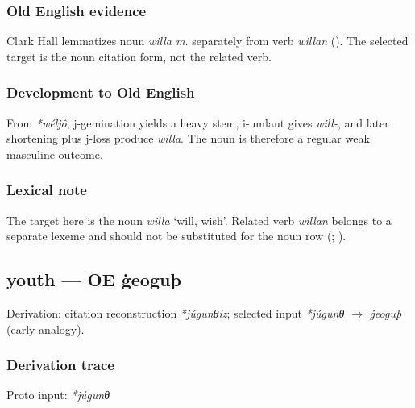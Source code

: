 \documentclass[
  british,
  a4paper,
]{article}
\begin{document}
\subsubsection{Old English evidence}\label{old-english-evidence-6}

Clark Hall lemmatizes noun \emph{willa m.} separately from verb
\emph{willan} (). The
selected target is the noun citation form, not the related verb.

\subsubsection{Development to Old
English}\label{development-to-old-english-6}

From \emph{*wéljô}, j-gemination yields a heavy stem, i-umlaut gives
\emph{will-}, and later shortening plus j-loss produce \emph{willa}. The
noun is therefore a regular weak masculine outcome.

\subsubsection{Lexical note}\label{lexical-note}

The target here is the noun \emph{willa} `will, wish'. Related verb
\emph{willan} belongs to a separate lexeme and should not be substituted
for the noun row (;
).

\subsection{youth --- OE ġeoguþ}\label{youth-oe-ux121eoguuxfe}

Derivation: citation reconstruction \emph{*júgunθiz}; selected input
\emph{*júgunθ} \(\rightarrow\) \emph{ġeoguþ} (early analogy).

\subsubsection{Derivation trace}\label{derivation-trace-7}

Proto input: \emph{*júgunθ}

\begingroup
\setlength{\fboxsep}{6pt}
\end{document}
